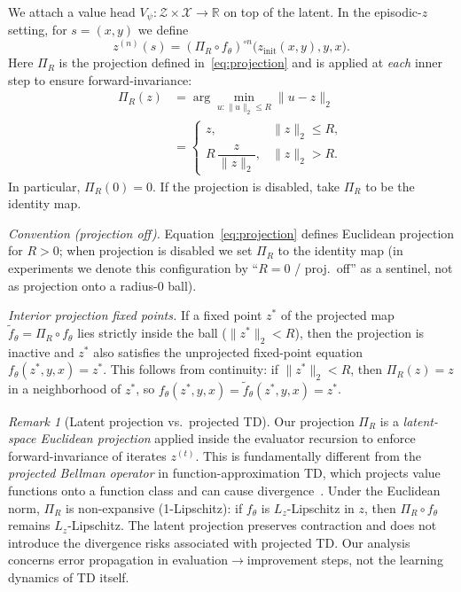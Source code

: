 \documentclass{article}
\theoremstyle{plain}
\theoremstyle{definition}
\theoremstyle{remark}
\newtheorem{remark}[theorem]{Remark}
\newcommand{\R}{\mathbb{R}}
\newcommand{\XX}{\mathcal{X}}
\newcommand{\ZZ}{\mathcal{Z}}
\begin{document}
{We attach a value head $V_\psi:\ZZ\times\XX\to\R$ on top of the latent.
In the episodic-$z$ setting, for $s=(x,y)$ we define
\begin{equation}
    z^{(n)}(s)
    =
    (\Pi_R \circ f_\theta)^{\circ n}\bigl(z_{\mathrm{init}}(x,y),y,x\bigr).
\end{equation}
Here $\Pi_R$ is the projection defined in~\eqref{eq:projection} and is applied at \emph{each} inner step to ensure forward-invariance:
\begin{equation}
\begin{split}
\Pi_R(z) &= \arg\min_{u:\|u\|_2\le R}\|u-z\|_2 \\
&=
\begin{cases}
z, & \|z\|_2 \le R,\\[2pt]
R\,\dfrac{z}{\|z\|_2}, & \|z\|_2 > R.
\end{cases}
\end{split}
\label{eq:projection}
\end{equation}
In particular, $\Pi_R(0)=0$.
If the projection is disabled, take $\Pi_R$ to be the identity map.

\noindent\emph{Convention (projection off).} Equation~\eqref{eq:projection} defines Euclidean projection for $R>0$; when projection is disabled we set $\Pi_R$ to the identity map (in experiments we denote this configuration by ``$R{=}0$ / proj.\ off'' as a sentinel, not as projection onto a radius-$0$ ball).

\emph{Interior projection fixed points.}
If a fixed point $z^*$ of the projected map $\tilde f_\theta = \Pi_R \circ f_\theta$ lies strictly inside the ball ($\|z^*\|_2 < R$), then the projection is inactive and $z^*$ also satisfies the unprojected fixed-point equation $f_\theta(z^*,y,x) = z^*$.
This follows from continuity: if $\|z^*\|_2 < R$, then $\Pi_R(z) = z$ in a neighborhood of $z^*$, so $f_\theta(z^*,y,x) = \tilde f_\theta(z^*,y,x) = z^*$.

\begin{remark}[Latent projection vs.\ projected TD]
\label{rem:projection_distinction}
Our projection $\Pi_R$ is a \emph{latent-space Euclidean projection} applied inside the evaluator recursion to enforce forward-invariance of iterates $z^{(t)}$.
This is fundamentally different from the \emph{projected Bellman operator} in function-approximation TD, which projects value functions onto a function class and can cause divergence~\citep{Baird1995Residual,TsitsiklisVanRoy1997}.
Under the Euclidean norm, $\Pi_R$ is non-expansive (1-Lipschitz): if $f_\theta$ is $L_z$-Lipschitz in $z$, then $\Pi_R\circ f_\theta$ remains $L_z$-Lipschitz.
The latent projection preserves contraction and does not introduce the divergence risks associated with projected TD.
Our analysis concerns error propagation in evaluation$\rightarrow$improvement steps, not the learning dynamics of TD itself.
\end{remark}

}
\end{document}
